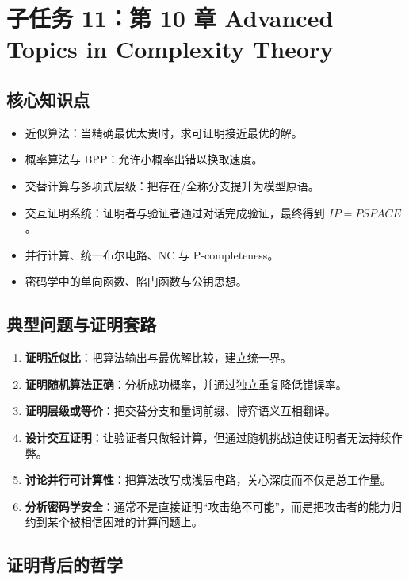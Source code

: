 \section{子任务 11：第 10 章 Advanced Topics in Complexity Theory}

\subsection{核心知识点}

\begin{itemize}[leftmargin=2em]
  \item 近似算法：当精确最优太贵时，求可证明接近最优的解。
  \item 概率算法与 BPP：允许小概率出错以换取速度。
  \item 交替计算与多项式层级：把存在/全称分支提升为模型原语。
  \item 交互证明系统：证明者与验证者通过对话完成验证，最终得到 $IP = PSPACE$。
  \item 并行计算、统一布尔电路、NC 与 P-completeness。
  \item 密码学中的单向函数、陷门函数与公钥思想。
\end{itemize}

\subsection{典型问题与证明套路}

\begin{enumerate}[leftmargin=2em]
  \item \textbf{证明近似比}：把算法输出与最优解比较，建立统一界。
  \item \textbf{证明随机算法正确}：分析成功概率，并通过独立重复降低错误率。
  \item \textbf{证明层级或等价}：把交替分支和量词前缀、博弈语义互相翻译。
  \item \textbf{设计交互证明}：让验证者只做轻计算，但通过随机挑战迫使证明者无法持续作弊。
  \item \textbf{讨论并行可计算性}：把算法改写成浅层电路，关心深度而不仅是总工作量。
  \item \textbf{分析密码学安全}：通常不是直接证明“攻击绝不可能”，而是把攻击者的能力归约到某个被相信困难的计算问题上。
\end{enumerate}

\subsection{证明背后的哲学}

